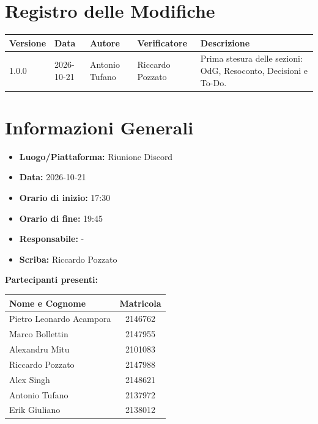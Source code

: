 \documentclass[a4paper, 11pt]{article}
\begin{document}
\section*{Registro delle Modifiche}
\vspace{0.5cm}
\begin{center}
\renewcommand{\arraystretch}{1.5}
\begin{tabularx}{\textwidth}{|l|l|l|l|X|}
\hline
\textbf{Versione} & \textbf{Data} & \textbf{Autore} & \textbf{Verificatore} & \textbf{Descrizione} \\ \hline
1.0.0 & 2026-10-21 & Antonio Tufano & Riccardo Pozzato & Prima stesura delle sezioni: OdG, Resoconto, Decisioni e To-Do. \\ \hline

\end{tabularx}
\end{center}

\newpage

\tableofcontents
\newpage
\section{Informazioni Generali}
\begin{itemize}
    \item \textbf{Luogo/Piattaforma:} Riunione Discord
    \item \textbf{Data:} 2026-10-21
    \item \textbf{Orario di inizio:} 17:30
    \item \textbf{Orario di fine:} 19:45
    \item \textbf{Responsabile:} -
    \item \textbf{Scriba:} Riccardo Pozzato
\end{itemize}

\vspace{0.5cm}
\textbf{Partecipanti presenti:} \\
\vspace{0.2cm}
\renewcommand{\arraystretch}{1.2}
\begin{tabularx}{0.8\textwidth}{|X|c|}
\hline
\textbf{Nome e Cognome} & \textbf{Matricola} \\ \hline
Pietro Leonardo Acampora & 2146762 \\ \hline
Marco Bollettin & 2147955 \\ \hline
Alexandru Mitu & 2101083 \\ \hline
Riccardo Pozzato & 2147988 \\ \hline
Alex Singh & 2148621 \\ \hline
Antonio Tufano & 2137972 \\ \hline
Erik Giuliano & 2138012 \\ \hline
\end{tabularx}
\end{document}
